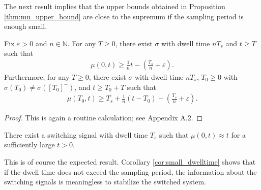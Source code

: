 \documentclass[a4, 11pt]{article}
\begin{document}
The next result implies that the upper bounds obtained in 
Proposition \ref{thm:mu_upper_bound} are close to the supremum if
the sampling period is enough small.
\begin{proposition}
\label{thm:mu_lower_bound}
Fix $\varepsilon > 0$ and $n \in \mathbb{N}$.
For any $T \geq 0$,
there exist $\sigma$ with dwell time $nT_s$ and $t \geq T$ such that
\begin{align*}
\mu(0,t) \geq \frac{1}{n}t - \left( \frac{T_s}{n} + \varepsilon \right).
\end{align*}
Furthermore, for any $T \geq 0$,
there exist $\sigma$ with dwell time $nT_s$, $T_0 \geq 0$ with
$\sigma(T_0) \not= \sigma([T_0]^-)$, and
$t \geq T_0 + T$ such that 
\begin{align}
\label{eq:lowerbound2}
\mu(T_0,t) \geq T_s + \frac{1}{n}(t-T_0) - \left( \frac{T_s}{n} + \varepsilon \right).
\end{align}
\end{proposition}
\begin{proof}
This is again a routine calculation; see Appendix A.2.
\end{proof}

\begin{corollary}
\label{cor:small_dwelltime}
There exist a switching signal with dwell time $T_s$ such
that $\mu(0,t) \approx t$ for a sufficiently large $t>0$.
\end{corollary}
This is of course the expected result.
Corollary \ref{cor:small_dwelltime} shows that
if the dwell time does not exceed the sampling period,
the information about the switching signals is meaningless to
stabilize the switched system.
\end{document}

